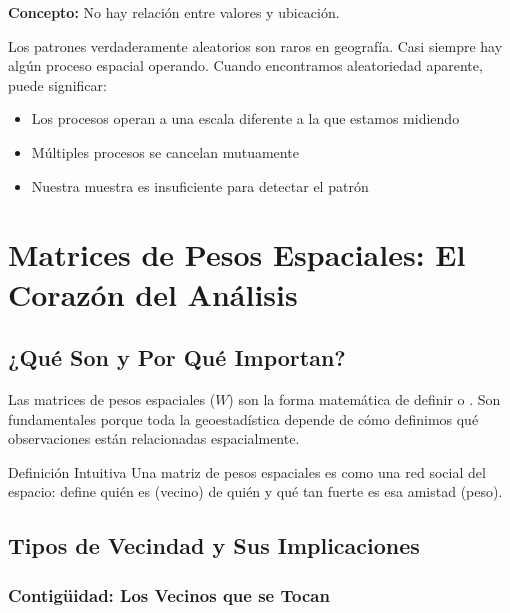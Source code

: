 \documentclass[12pt,a4paper]{article}
\begin{document}
\textbf{Concepto:} No hay relación entre valores y ubicación.

\begin{reflexion}
Los patrones verdaderamente aleatorios son raros en geografía. Casi siempre hay algún proceso espacial operando. Cuando encontramos aleatoriedad aparente, puede significar:
\begin{itemize}
    \item Los procesos operan a una escala diferente a la que estamos midiendo
    \item Múltiples procesos se cancelan mutuamente
    \item Nuestra muestra es insuficiente para detectar el patrón
\end{itemize}
\end{reflexion}

\section{Matrices de Pesos Espaciales: El Corazón del Análisis}

\subsection{¿Qué Son y Por Qué Importan?}

Las matrices de pesos espaciales ($W$) son la forma matemática de definir  o . Son fundamentales porque toda la geoestadística depende de cómo definimos qué observaciones están relacionadas espacialmente.

\begin{conceptbox}{Definición Intuitiva}
Una matriz de pesos espaciales es como una red social del espacio: define quién es  (vecino) de quién y qué tan fuerte es esa amistad (peso).
\end{conceptbox}

\subsection{Tipos de Vecindad y Sus Implicaciones}

\subsubsection{Contigüidad: Los Vecinos que se Tocan}
\end{document}
